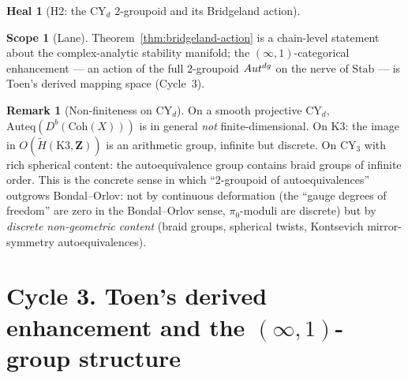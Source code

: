 \documentclass[11pt]{amsart}
\theoremstyle{definition}
\newtheorem{heal}[attack]{Heal}
\newtheorem{scope}[theorem]{Scope}
\newtheorem{remark}{Remark}
\providecommand{\Coh}{\mathrm{Coh}}
\providecommand{\Auteq}{\mathrm{Auteq}}
\providecommand{\Autdg}{\mathrm{Aut}^{\rm dg}}
\providecommand{\Stab}{\mathrm{Stab}}
\providecommand{\bZ}{\mathbf{Z}}
\begin{document}
\begin{heal}[H2: the CY$_d$ 2-groupoid and its Bridgeland action]
\begin{scope}[Lane]\label{scope:lane-bridgeland}
Theorem~\ref{thm:bridgeland-action} is a chain-level statement about
the complex-analytic stability manifold; the
$(\infty,1)$-categorical enhancement --- an action of the full 2-groupoid
$\Autdg$ on the nerve of $\Stab$ --- is Toen's derived mapping space
(Cycle~3).
\end{scope}

\begin{remark}[Non-finiteness on CY$_d$]
On a smooth projective CY$_d$, $\Auteq(D^b(\Coh(X)))$ is in general
\emph{not} finite-dimensional. On K3: the image in
$O(\widetilde{H}(\mathrm{K3}, \bZ))$ is an arithmetic group, infinite
but discrete. On CY$_3$ with rich spherical content: the autoequivalence
group contains braid groups of infinite order. This is the concrete
sense in which ``2-groupoid of autoequivalences'' outgrows
Bondal--Orlov: not by continuous deformation (the ``gauge degrees of
freedom'' are zero in the Bondal--Orlov sense, $\pi_0$-moduli are
discrete) but by \emph{discrete non-geometric content} (braid groups,
spherical twists, Kontsevich mirror-symmetry autoequivalences).
\end{remark}
\end{heal}

\section{Cycle 3. Toen's derived enhancement and the
$(\infty,1)$-group structure}
\label{sec:cycle-toen}
\end{document}
